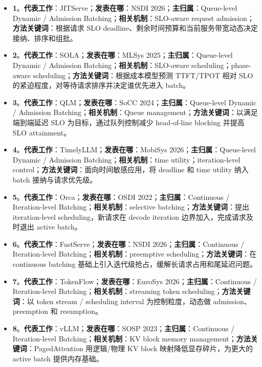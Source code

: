 \documentclass[a4paper,twocolumn,10pt]{ctexart}
\begin{document}
\begin{itemize}
\item \textbf{1}。\textbf{代表工作}：JITServe；\textbf{发表在哪}：NSDI 2026；\textbf{主归属}：Queue-level Dynamic / Admission Batching；\textbf{相关机制}：SLO-aware request admission；\textbf{方法关键词}：根据请求 SLO deadline、剩余时间预算和当前服务带宽动态决定接纳、排序和组批。
\item \textbf{2}。\textbf{代表工作}：SOLA；\textbf{发表在哪}：MLSys 2025；\textbf{主归属}：Queue-level Dynamic / Admission Batching；\textbf{相关机制}：SLO-aware scheduling；phase-aware scheduling；\textbf{方法关键词}：根据成本模型预测 TTFT/TPOT 相对 SLO 的紧迫程度，对等待请求排序并决定谁优先进入 batch。
\item \textbf{3}。\textbf{代表工作}：QLM；\textbf{发表在哪}：SoCC 2024；\textbf{主归属}：Queue-level Dynamic / Admission Batching；\textbf{相关机制}：Queue management；\textbf{方法关键词}：以满足端到端延迟 SLO 为目标，通过队列控制减少 head-of-line blocking 并提高 SLO attainment。
\item \textbf{4}。\textbf{代表工作}：TimelyLLM；\textbf{发表在哪}：MobiSys 2026；\textbf{主归属}：Queue-level Dynamic / Admission Batching；\textbf{相关机制}：time utility；iteration-level control；\textbf{方法关键词}：面向时间敏感应用，将 deadline 和 time utility 纳入 batch 接纳与请求优先级。
\item \textbf{5}。\textbf{代表工作}：Orca；\textbf{发表在哪}：OSDI 2022；\textbf{主归属}：Continuous / Iteration-level Batching；\textbf{相关机制}：selective batching；\textbf{方法关键词}：提出 iteration-level scheduling，新请求在 decode iteration 边界加入，完成请求及时退出 active batch。
\item \textbf{6}。\textbf{代表工作}：FastServe；\textbf{发表在哪}：NSDI 2026；\textbf{主归属}：Continuous / Iteration-level Batching；\textbf{相关机制}：preemptive scheduling；\textbf{方法关键词}：在 continuous batching 基础上引入迭代级抢占，缓解长请求占用和尾延迟问题。
\item \textbf{7}。\textbf{代表工作}：TokenFlow；\textbf{发表在哪}：EuroSys 2026；\textbf{主归属}：Continuous / Iteration-level Batching；\textbf{相关机制}：streaming token scheduling；\textbf{方法关键词}：以 token stream / scheduling interval 为控制粒度，动态做 admission、preemption 和 resumption。
\item \textbf{8}。\textbf{代表工作}：vLLM；\textbf{发表在哪}：SOSP 2023；\textbf{主归属}：Continuous / Iteration-level Batching；\textbf{相关机制}：KV block memory management；\textbf{方法关键词}：PagedAttention 用逻辑/物理 KV block 映射降低显存碎片，为更大的 active batch 提供内存基础。

\end{itemize}
\end{document}
